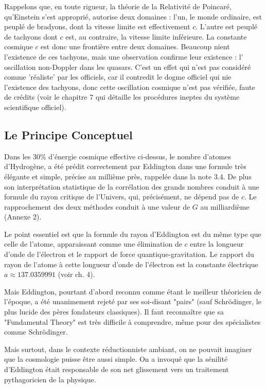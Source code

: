\documentclass[a4paper,12pt]{article}
\begin{document}
Rappelons que, en toute rigueur, la théorie de la Relativité de Poincaré, qu'Einstein s'est approprié, autorise deux domaines : l'un, le monde ordinaire, est peuplé de bradyons, dont la vitesse limite est effectivement $c$. L'autre est peuplé de tachyons dont $c$ est, au contraire, la vitesse limite inférieure. La constante cosmique $c$ est donc une frontière entre deux domaines. Beaucoup nient l'existence de ces tachyons, mais une observation confirme leur existence : l' oscillation non-Doppler dans les quasars. C'est un effet qui n'est pas considéré comme 'réaliste' par les officiels, car il contredit le dogme officiel qui nie l'existence des tachyons, donc cette oscillation cosmique n'est pas vérifiée, faute de crédits (voir le chapitre 7 qui détaille les procédures ineptes du système scientifique officiel).

\subsection{Le Principe Conceptuel}
 

Dans les 30\% d'énergie cosmique effective ci-dessus, le nombre d'atomes d'Hydrogène, a été prédit correctement par Eddington dans une formule très élégante et simple, précise au millième près, rappelée dans la note 3.4. De plus son interprétation statistique de la corrélation des grands nombres conduit à une formule du rayon critique de l'Univers, qui, précisément, ne dépend pas de $c$. Le rapprochement des deux méthodes conduit à une valeur de $G$ au milliardième (Annexe 2).

Le point essentiel est que la formule du rayon d'Eddington est du même type que celle de l'atome, apparaissant comme une élimination de $c$ entre la longueur d'onde de l'électron et le rapport de force quantique-gravitation. Le rapport du rayon de l'atome à cette longueur d'onde de l'électron est la constante électrique $a \approx 137.0359991$ (voir ch. 4).
  
Mais Eddington, pourtant d'abord reconnu comme étant le meilleur théoricien de l'époque, a été unanimement rejeté par ses soi-disant "pairs" (sauf Schrödinger, le plus lucide des pères fondateurs classiques). Il faut reconnaître que sa "Fundamental Theory" est très difficile à comprendre, même pour des spécialistes comme Schrödinger. 


Mais surtout, dans le contexte réductionniste ambiant, on ne pouvait imaginer que la cosmologie puisse être aussi simple. On a invoqué que la sénilité d'Eddington était responsable de son net glissement vers un traitement pythagoricien de la physique.
\end{document}
